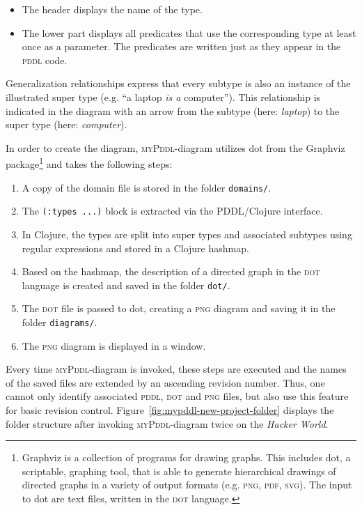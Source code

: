 \documentclass[runningheads]{llncs}
\newcommand{\mypddl}{\textsc{myPddl}\xspace}
\newcommand{\pddl}{\textsc{pddl}\xspace}
\begin{document}
\begin{description}
  \begin{itemize}
  \item The header displays the name of the type.
  \item The lower part displays all predicates that use the
    corresponding type at least once as a parameter. The predicates
    are written just as they appear in the \pddl code.
\end{itemize}

Generalization relationships express that every subtype is also an
instance of the illustrated super type (e.g. ``a laptop \emph{is a}
computer''). This relationship is indicated in the diagram with an
arrow from the subtype (here: \emph{laptop}) to the super type (here:
\emph{computer}).


In order to create the diagram, \mypddl-diagram utilizes dot from the
Graphviz package\footnote{Graphviz is a collection of programs for
  drawing graphs. This includes dot, a scriptable, graphing tool, that
  is able to generate hierarchical drawings of directed graphs in a
  variety of output formats (e.g. \textsc{png}, \textsc{pdf},
  \textsc{svg}). The input to dot are text files, written in the
  \textsc{dot} language.} \cite{ellson2002graphviz} and takes the
following steps:

\begin{enumerate}
\item A copy of the domain file is stored in the folder
  \texttt{domains/}.
\item The \texttt{(:types~...)} block is extracted via the PDDL/Clojure
  interface.
\item In Clojure, the types are split into super types and associated
  subtypes using regular expressions and stored in a Clojure hashmap.
\item Based on the hashmap, the description of a directed graph in the
  \textsc{dot} language is created and saved in the folder
  \texttt{dot/}.
\item The \textsc{dot} file is passed to dot, creating a \textsc{png}
  diagram and saving it in the folder
  \texttt{diagrams/}.
\item The \textsc{png} diagram is displayed in a window.
\end{enumerate}

Every time \mypddl-diagram is invoked, these steps are executed and
the names of the saved files are extended by an ascending revision
number. Thus, one cannot only identify associated \pddl, \textsc{dot}
and \textsc{png} files, but also use this feature for basic revision
control. Figure~\ref{fig:mypddl-new-project-folder} displays the
folder structure after invoking \mypddl-diagram twice on the
\emph{Hacker World}.


\end{description}
\end{document}

